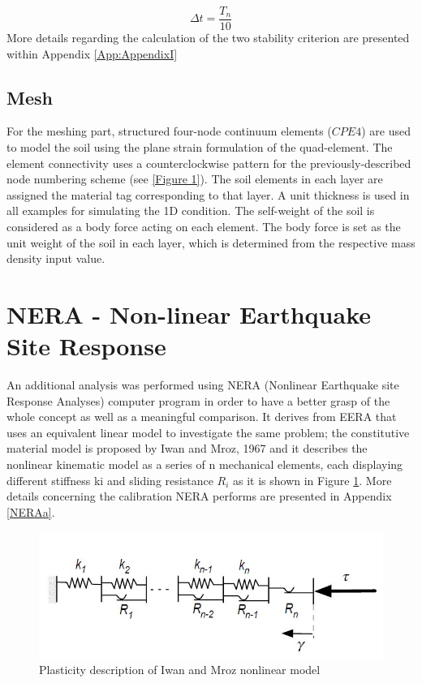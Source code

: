 	\begin{equation}
	\Delta t=\frac{T_n}{10}
	\end{equation}
	More details regarding the calculation of the two stability criterion are presented within Appendix \ref{App:AppendixI}
	
	\subsection{Mesh}
	For the meshing part, structured four-node continuum elements ($CPE4$) are used to model the soil using the plane strain formulation of the quad-element. The element connectivity uses a counterclockwise pattern for the previously-described node numbering scheme (see \ref{Figure 1}). The soil elements in each layer are assigned the material tag corresponding to that layer. A unit thickness is used in all examples for simulating the 1D condition. The self-weight of the soil is considered as a body force acting on each element. The body force is set as the unit weight of the soil in each layer, which is determined from the respective mass density input value.
	
	
	\section{NERA - Non-linear Earthquake Site Response}
	An additional analysis was performed using NERA (Nonlinear Earthquake site Response Analyses) \cite{NERA} computer program in order to have a better grasp of the whole concept as well as a meaningful comparison. It derives from EERA that uses an equivalent linear model to investigate the same problem; the constitutive material model is proposed by Iwan and Mroz, 1967 \cite{mroz1967description} and it describes the nonlinear kinematic model as a series of n mechanical elements, each displaying different stiffness ki and sliding resistance $R_i$ as it is shown in Figure \ref{Mroz}. More details concerning the calibration NERA performs are presented in Appendix \ref{NERAa}. %
	
	\begin{figure}[h!]
		\centering
		\includegraphics[width=0.7\linewidth]{"Mroz"}
		\caption[]{Plasticity description of Iwan and Mroz nonlinear model}
		\label{Mroz}
	\end{figure}
	
